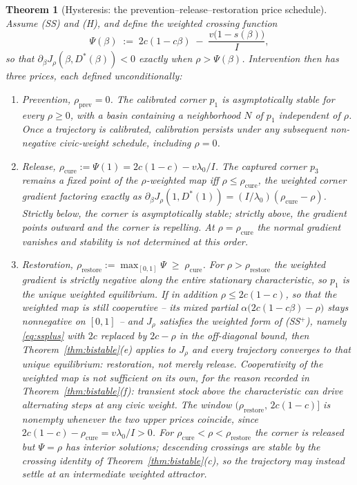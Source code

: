 \documentclass[11pt]{article}
\newtheorem{theorem}{Theorem}[section]
\theoremstyle{definition}
\theoremstyle{remark}
\numberwithin{equation}{section}
\begin{document}
\begin{theorem}[Hysteresis: the prevention--release--restoration price schedule]\label{thm:hyst}
Assume (SS) and (H), and define the \emph{weighted crossing function}
\begin{equation}\label{eq:Psi}
\Psi(\beta) \;:=\; 2c(1-c\beta) \;-\; \frac{v\bigl(1-s(\beta)\bigr)}{I},
\end{equation}
so that $\partial_\beta J_\rho(\beta, D^\ast(\beta)) < 0$ exactly when $\rho > \Psi(\beta)$. Intervention then has three prices, each defined unconditionally:
\begin{enumerate}
\item[(i)] \emph{Prevention}, $\rho_{\mathrm{prev}} = 0$. The calibrated corner $p_1$ is asymptotically stable for \emph{every} $\rho \ge 0$, with a basin containing a neighborhood $N$ of $p_1$ independent of $\rho$. Once a trajectory is calibrated, calibration persists under any subsequent non-negative civic-weight schedule, including $\rho = 0$.
\item[(ii)] \emph{Release}, $\rho_{\mathrm{cure}} := \Psi(1) = 2c(1-c) - v\lambda_0/I$. The captured corner $p_3$ remains a fixed point of the $\rho$-weighted map iff $\rho \le \rho_{\mathrm{cure}}$, the weighted corner gradient factoring exactly as $\partial_\beta J_\rho(1, D^\ast(1)) = (I/\lambda_0)(\rho_{\mathrm{cure}} - \rho)$. Strictly below, the corner is asymptotically stable; strictly above, the gradient points outward and the corner is repelling. At $\rho = \rho_{\mathrm{cure}}$ the normal gradient vanishes and stability is not determined at this order.
\item[(iii)] \emph{Restoration}, $\rho_{\mathrm{restore}} := \max_{[0,1]}\Psi \;\ge\; \rho_{\mathrm{cure}}$. For $\rho > \rho_{\mathrm{restore}}$ the weighted gradient is strictly negative along the entire stationary characteristic, so $p_1$ is the \emph{unique} weighted equilibrium. If in addition $\rho \le 2c(1-c)$, so that the weighted map is still cooperative -- its mixed partial $\alpha\bigl(2c(1-c\beta)-\rho\bigr)$ stays nonnegative on $[0,1]$ -- and $J_\rho$ satisfies the weighted form of (SS$^+$), namely \eqref{eq:ssplus} with $2c$ replaced by $2c-\rho$ in the off-diagonal bound, then Theorem~\ref{thm:bistable}(e) applies to $J_\rho$ and every trajectory converges to that unique equilibrium: restoration, not merely release. Cooperativity of the weighted map is not sufficient on its own, for the reason recorded in Theorem~\ref{thm:bistable}(f): transient stock above the characteristic can drive alternating steps at any civic weight. The window $(\rho_{\mathrm{restore}},\,2c(1-c)]$ is nonempty whenever the two upper prices coincide, since $2c(1-c)-\rho_{\mathrm{cure}} = v\lambda_0/I > 0$. For $\rho_{\mathrm{cure}} < \rho < \rho_{\mathrm{restore}}$ the corner is released but $\Psi = \rho$ has interior solutions; descending crossings are stable by the crossing identity of Theorem~\ref{thm:bistable}(c), so the trajectory may instead settle at an intermediate weighted attractor.

\end{enumerate}
\end{theorem}
\end{document}
